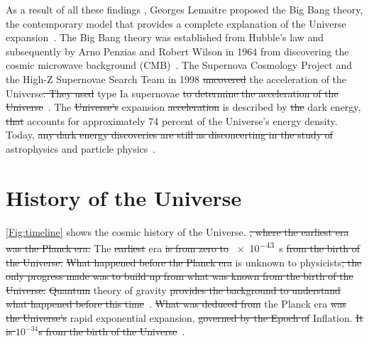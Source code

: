 	As a result of all these findings , Georges Lemaitre proposed the Big Bang theory, the contemporary model that provides a complete explanation of the Universe expansion~\citep{1926ApJ....64..321H}. The Big Bang theory was established from Hubble's law and subsequently by Arno Penzias and Robert Wilson in 1964 from discovering the cosmic microwave background (CMB)~\citep{1965ApJ...142..419P,2003RvMP...75..559P,1929PNAS...15..168H}. The Supernova Cosmology Project and the High-Z Supernovae Search Team in 1998 \st{uncovered}  the acceleration of the Universe\st{. They used}  type Ia supernovae \st{to determine the acceleration of the Universe}~\citep{1998AJ....116.1009R, 1999ApJ...517..565P}. The \st{Universe's}  expansion \st{acceleration} is described by \st{the} dark energy, \st{that}  accounts for approximately 74 percent of the Universe's energy density. Today, \st{any dark energy discoveries are still as disconcerting in the study of}  astrophysics and particle physics~\citep{2008ARA&A..46..385F}.  \\ 
	
	\section{History of the Universe}
	
	\autoref{Fig:timeline} shows the cosmic history of the Universe. \st{, where the earliest era was the Planck era.} The \st{earliest}  era \st{is from zero to} \SI{e-43}{s} \st{from the birth of the Universe.}  \st{What happened before the Planck era} is unknown to physicists\st{; the only progress made was to build up from what was known from the birth of the Universe.}  \st{Quantum} theory of gravity \st{provides the background to understand what happened before this time}~\citep{1981PhRvD..23..347G}. \st{What was deduced from}  the Planck era \st{was the Universe's} rapid exponential expansion, \st{governed by the Epoch of}  Inflation. \st{It is $10^{-34}$s from the birth of the Universe}~\citep{Planck}. 

